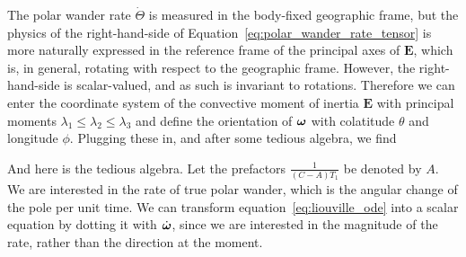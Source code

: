 \documentclass[extra,mreferee]{gji}
\newif\ifdetail
\begin{document}
The polar wander rate $\dot{\Theta}$ is measured in the body-fixed geographic frame, 
but the physics of the right-hand-side of Equation~\eqref{eq:polar_wander_rate_tensor} 
is more naturally expressed in the reference frame of the principal axes of $\mathbf{E}$,
which is, in general, rotating with respect to the geographic frame.
However, the right-hand-side is scalar-valued, and as such is invariant to rotations.
Therefore we can enter the coordinate system of the convective moment of inertia $\mathbf{E}$ 
with principal moments $\lambda_1 \le \lambda_2 \le \lambda_3$ and define the orientation of 
$\mitbf{\omega}$ with colatitude $\theta$ and longitude $\phi$.
Plugging these in, and after some tedious algebra, we find
\ifdetail

And here is the tedious algebra.  Let the prefactors $\frac{1}{(C-A)T_1}$ be denoted by $A$.
We are interested in the rate of true polar wander, which is the angular change of the pole
per unit time. We can transform equation~\ref{eq:liouville_ode} into a scalar equation by dotting it
with $\dot{\mitbf{\omega}}$, since we are interested in the magnitude of the rate, rather than
the direction at the moment.
\end{document}
